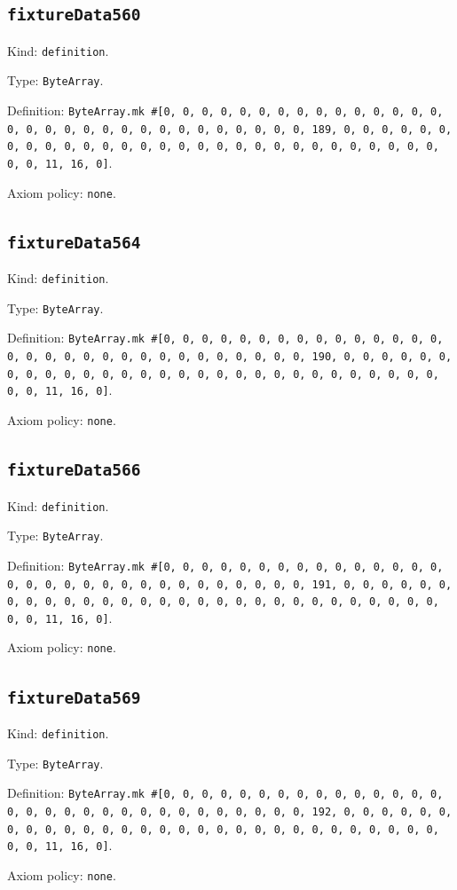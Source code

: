 \documentclass[11pt]{article}
\begin{document}
\subsection*{\texttt{fixtureData560}}
\noindent Kind: \texttt{definition}.\par
\noindent Type: \texttt{ByteArray}.\par
\noindent Definition: \texttt{ByteArray.mk \#[0, 0, 0, 0, 0, 0, 0, 0, 0, 0, 0, 0, 0, 0, 0, 0, 0, 0, 0, 0, 0, 0, 0, 0, 0, 0, 0, 0, 0, 0, 0, 189, 0, 0, 0, 0, 0, 0, 0, 0, 0, 0, 0, 0, 0, 0, 0, 0, 0, 0, 0, 0, 0, 0, 0, 0, 0, 0, 0, 0, 0, 0, 0, 11, 16, 0]}.\par
\noindent Axiom policy: \texttt{none}.\par
\subsection*{\texttt{fixtureData564}}
\noindent Kind: \texttt{definition}.\par
\noindent Type: \texttt{ByteArray}.\par
\noindent Definition: \texttt{ByteArray.mk \#[0, 0, 0, 0, 0, 0, 0, 0, 0, 0, 0, 0, 0, 0, 0, 0, 0, 0, 0, 0, 0, 0, 0, 0, 0, 0, 0, 0, 0, 0, 0, 190, 0, 0, 0, 0, 0, 0, 0, 0, 0, 0, 0, 0, 0, 0, 0, 0, 0, 0, 0, 0, 0, 0, 0, 0, 0, 0, 0, 0, 0, 0, 0, 11, 16, 0]}.\par
\noindent Axiom policy: \texttt{none}.\par
\subsection*{\texttt{fixtureData566}}
\noindent Kind: \texttt{definition}.\par
\noindent Type: \texttt{ByteArray}.\par
\noindent Definition: \texttt{ByteArray.mk \#[0, 0, 0, 0, 0, 0, 0, 0, 0, 0, 0, 0, 0, 0, 0, 0, 0, 0, 0, 0, 0, 0, 0, 0, 0, 0, 0, 0, 0, 0, 0, 191, 0, 0, 0, 0, 0, 0, 0, 0, 0, 0, 0, 0, 0, 0, 0, 0, 0, 0, 0, 0, 0, 0, 0, 0, 0, 0, 0, 0, 0, 0, 0, 11, 16, 0]}.\par
\noindent Axiom policy: \texttt{none}.\par
\subsection*{\texttt{fixtureData569}}
\noindent Kind: \texttt{definition}.\par
\noindent Type: \texttt{ByteArray}.\par
\noindent Definition: \texttt{ByteArray.mk \#[0, 0, 0, 0, 0, 0, 0, 0, 0, 0, 0, 0, 0, 0, 0, 0, 0, 0, 0, 0, 0, 0, 0, 0, 0, 0, 0, 0, 0, 0, 0, 192, 0, 0, 0, 0, 0, 0, 0, 0, 0, 0, 0, 0, 0, 0, 0, 0, 0, 0, 0, 0, 0, 0, 0, 0, 0, 0, 0, 0, 0, 0, 0, 11, 16, 0]}.\par
\noindent Axiom policy: \texttt{none}.\par
\end{document}
